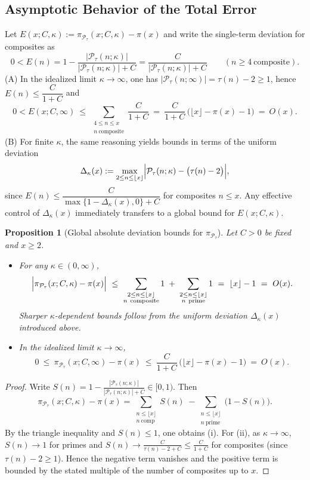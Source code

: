 \documentclass[11pt,a4paper]{amsart}
\theoremstyle{plain}
\newtheorem{proposition}[theorem]{Proposition}
\theoremstyle{definition}
\theoremstyle{remark}
\begin{document}
\subsection{Asymptotic Behavior of the Total Error}
Let $E(x;C,\kappa):=\pi_{\mathcal P_\tau}(x; C, \kappa) - \pi(x)$ and write the single-term deviation for composites as
\[
0< E(n)=1-\frac{|\mathcal P_\tau(n;\kappa)|}{|\mathcal P_\tau(n;\kappa)|+C}
=\frac{C}{|\mathcal P_\tau(n;\kappa)|+C}\qquad(n\ge4\ \text{composite}).
\]
(A) In the idealized limit $\kappa\to\infty$, one has $|\mathcal P_\tau(n;\infty)|=\tau(n)-2\ge1$, hence $E(n)\le \dfrac{C}{1+C}$ and
\[
0< E(x;C,\infty)\ \le\ \sum_{\substack{4\le n\le x\\ n\ \mathrm{composite}}}\frac{C}{1+C}
\ =\ \frac{C}{1+C}\,\bigl(\lfloor x\rfloor-\pi(x)-1\bigr)
\ =\ O(x).
\]
(B) For finite $\kappa$, the same reasoning yields bounds in terms of the uniform deviation
\[
\Delta_\kappa(x):=\max_{2\le n\le \lfloor x\rfloor}\Bigl|\mathcal P_\tau(n;\kappa)-\bigl(\tau(n)-2\bigr)\Bigr|,
\]
since $E(n)\le \dfrac{C}{\max\{1-\Delta_\kappa(x),0\}+C}$ for composites $n\le x$. Any effective control of $\Delta_\kappa(x)$ immediately transfers to a global bound for $E(x;C,\kappa)$.

\begin{proposition}[Global absolute deviation bounds for $\pi_{\mathcal P_\tau}$]
Let $C>0$ be fixed and $x\ge 2$.
\begin{itemize}
\item[(i)] For any $\kappa\in(0,\infty)$,
\[
\Bigl|\pi_{\mathcal P_\tau}(x;C,\kappa)-\pi(x)\Bigr|
\ \le\ \sum_{\substack{2\le n\le \lfloor x\rfloor\\ n\ \mathrm{composite}}} 1\;+\;\sum_{\substack{2\le n\le \lfloor x\rfloor\\ n\ \mathrm{prime}}} 1
\ =\ \lfloor x\rfloor-1
\ =\ O(x).
\]
Sharper $\kappa$-dependent bounds follow from the uniform deviation $\Delta_\kappa(x)$ introduced above.
\item[(ii)] In the idealized limit $\kappa\to\infty$,
\[
0\ \le\ \pi_{\mathcal P_\tau}(x;C,\infty)-\pi(x)
\ \le\ \frac{C}{1+C}\,\bigl(\lfloor x\rfloor-\pi(x)-1\bigr)
\ =\ O(x).
\]
\end{itemize}
\end{proposition}

\begin{proof}
Write $S(n)=1-\frac{|\mathcal P_\tau(n;\kappa)|}{|\mathcal P_\tau(n;\kappa)|+C}\in[0,1)$. Then
\[
\pi_{\mathcal P_\tau}(x;C,\kappa)-\pi(x)
=\sum_{\substack{n\le \lfloor x\rfloor\\ n\ \mathrm{comp}}}\!S(n)\;-\!\sum_{\substack{n\le \lfloor x\rfloor\\ n\ \mathrm{prime}}}\!\bigl(1-S(n)\bigr).
\]
By the triangle inequality and $S(n)\le 1$, one obtains (i). For (ii), as $\kappa\to\infty$, $S(n)\to 1$ for primes and $S(n)\to \frac{C}{\tau(n)-2+C}\le \frac{C}{1+C}$ for composites (since $\tau(n)-2\ge 1$). Hence the negative term vanishes and the positive term is bounded by the stated multiple of the number of composites up to $x$.
\end{proof}
\end{document}
